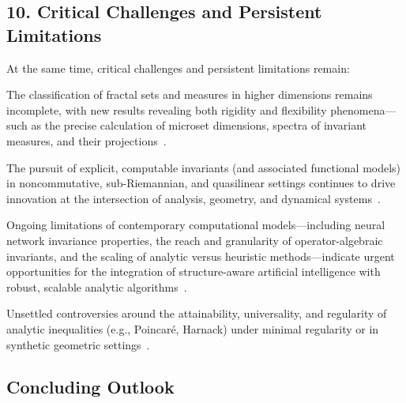 \documentclass[sigconf]{acmart}
\begin{document}
\subsection*{10. Critical Challenges and Persistent Limitations}

At the same time, critical challenges and persistent limitations remain:

The classification of fractal sets and measures in higher dimensions remains incomplete, with new results revealing both rigidity and flexibility phenomena---such as the precise calculation of microset dimensions, spectra of invariant measures, and their projections~\cite{ref76,ref100,ref69,ref72}.

The pursuit of explicit, computable invariants (and associated functional models) in noncommutative, sub-Riemannian, and quasilinear settings continues to drive innovation at the intersection of analysis, geometry, and dynamical systems~\cite{ref26,ref61,ref95}.

Ongoing limitations of contemporary computational models---including neural network invariance properties, the reach and granularity of operator-algebraic invariants, and the scaling of analytic versus heuristic methods---indicate urgent opportunities for the integration of structure-aware artificial intelligence with robust, scalable analytic algorithms~\cite{ref44,ref60,ref26}.

Unsettled controversies around the attainability, universality, and regularity of analytic inequalities (e.g., Poincaré, Harnack) under minimal regularity or in synthetic geometric settings~\cite{ref40,ref93}.

\subsection*{Concluding Outlook}
\end{document}
